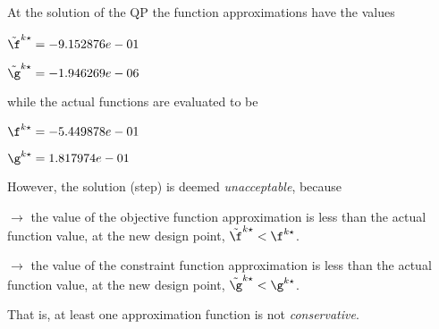At the solution of the QP the function approximations have the values

$\tilde \f^{k\star} = -9.152876e-01$

$\tilde \g^{k\star} = -1.946269e-06$

\bigskip
while the actual functions are evaluated to be

$\f^{k\star} = -5.449878e-01$

$\g^{k\star} =  1.817974e-01$

\bigskip
 However, the solution (step)                     is deemed \emph{unacceptable}, because 
 
$\to$ the value of the objective                         function approximation is less than the actual function                         value, at the new design point,                         $\tilde {\f}^{k\star} < {\f}^{k\star}$.

 $\to$ the value of the constraint function                         approximation is less than the actual function value, at                         the new design point, $\tilde {\g}^{k\star} < {\g}^{k\star}$.

 \bigskip 

 That is, at least one approximation                     function is not \emph{conservative}.
